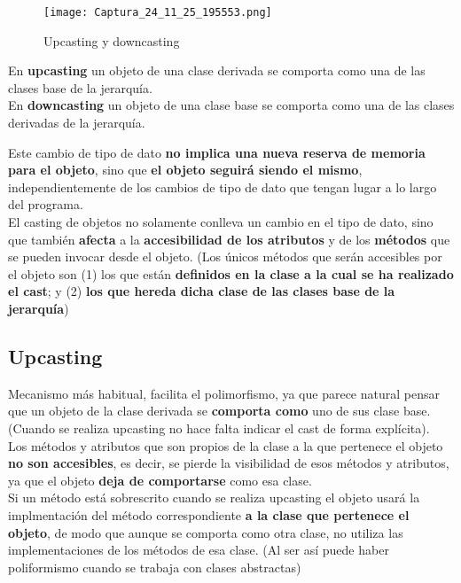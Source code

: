 \documentclass{article}
\begin{document}
\begin{wrapfigure}[]{r}{0.5\linewidth}
    \centering
    \texttt{[image: Captura\_24\_11\_25\_195553.png]}
    \caption{Upcasting y downcasting}
\end{wrapfigure}

En \textbf{upcasting} un objeto de una clase derivada se comporta como una de las clases base de la jerarquía. \\
En \textbf{downcasting} un objeto de una clase base se comporta como una de las clases derivadas de la jerarquía.

\newpage

Este cambio de tipo de dato \textbf{no implica una nueva reserva de memoria para el objeto}, sino que \textbf{el objeto seguirá siendo el mismo}, independientemente de los cambios de tipo de dato
que tengan lugar a lo largo del programa. \\

El casting de objetos no solamente conlleva un cambio en el tipo de dato, sino que también \textbf{afecta} a la \textbf{accesibilidad de los atributos} y de los \textbf{métodos} que se pueden invocar desde el objeto. (Los únicos métodos que serán accesibles por el objeto son (1) los
que están \textbf{definidos en la clase a la cual se ha realizado el cast}; y (2)
\textbf{los que hereda dicha clase de las clases base de la jerarquía})

\subsection{Upcasting}
Mecanismo más habitual, facilita el polimorfismo, ya que parece natural pensar que un objeto de la clase derivada se \textbf{comporta como} uno de sus clase base. (Cuando se realiza upcasting no hace falta indicar el cast de forma explícita). \\

Los métodos y atributos que son propios de la clase a la que pertenece el objeto \textbf{no son accesibles}, es decir, se pierde la visibilidad de esos métodos y atributos, ya que el objeto \textbf{deja de comportarse} como esa clase. \\

Si un método está sobrescrito cuando se realiza upcasting el objeto usará la implmentación del método correspondiente \textbf{a la clase que pertenece el objeto}, de modo que aunque se comporta como otra clase, no utiliza las implementaciones de los métodos de esa clase. (Al ser así puede haber poliformismo cuando se trabaja con clases abstractas) \\
\end{document}
